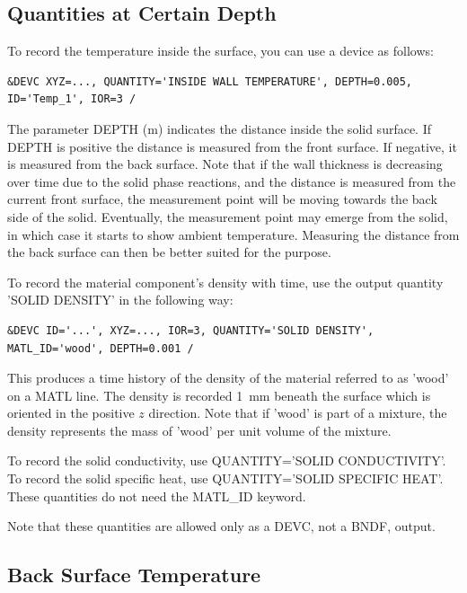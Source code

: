 \documentclass[11pt]{book}
\begin{document}
\subsection{Quantities at Certain Depth}
\label{info:DEPTH}

To record the temperature inside the surface, you can use a device as follows:
\begin{lstlisting}
&DEVC XYZ=..., QUANTITY='INSIDE WALL TEMPERATURE', DEPTH=0.005, ID='Temp_1', IOR=3 /
\end{lstlisting}
The parameter {\ct DEPTH} (m) indicates the distance inside the solid surface. If {\ct DEPTH} is positive the distance is measured from the front surface. If negative, it is measured from the back surface. Note that if the wall thickness is decreasing over time due to the solid phase reactions, and the distance is measured from the current front surface, the measurement point will be moving towards the back side of the solid. Eventually, the measurement point may emerge from the solid, in which case it starts to show ambient temperature. Measuring the distance from the back surface can then be better suited for the purpose.

To record the material component's density with time, use the output quantity {\ct 'SOLID DENSITY'} in the following way:
\begin{lstlisting}
&DEVC ID='...', XYZ=..., IOR=3, QUANTITY='SOLID DENSITY', MATL_ID='wood', DEPTH=0.001 /
\end{lstlisting}
This produces a time history of the density of the material referred to as {\ct 'wood'} on a {\ct MATL} line. The density is recorded 1~mm beneath the surface which is oriented in the positive $z$ direction. Note that if {\ct 'wood'} is part of a mixture, the density represents the mass of {\ct 'wood'} per unit volume of the mixture.

To record the solid conductivity, use {\ct QUANTITY='SOLID CONDUCTIVITY'}. To record the solid specific heat, use {\ct QUANTITY='SOLID SPECIFIC HEAT'}. These quantities do not need the {\ct MATL\_ID} keyword.

Note that these quantities are allowed only as a {\ct DEVC}, not a {\ct BNDF}, output.


\subsection{Back Surface Temperature}
\label{info:BACK}
\end{document}

